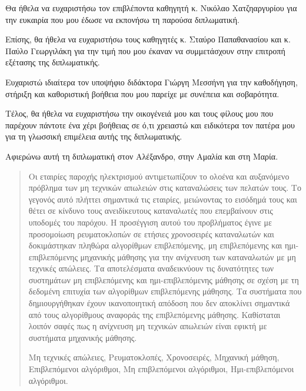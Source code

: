 \begin{acknowledgements}

Θα ήθελα να ευχαριστήσω τον επιβλέποντα καθηγητή κ. Νικόλαο Χατζηαργυρίου για την ευκαιρία που μου έδωσε να εκπονήσω τη παρούσα διπλωματική.

Επίσης, θα ήθελα να ευχαριστήσω  τους καθηγητές κ. Σταύρο Παπαθανασίου και κ. Παύλο Γεωργιλάκη για την τιμή που μου έκαναν να συμμετάσχουν στην επιτροπή εξέτασης της διπλωματικής.

Eυχαριστώ ιδιαίτερα τον υποψήφιο διδάκτορα Γιώργη Μεσσήνη για την καθοδήγηση, στήριξη και καθοριστική βοήθεια που μου παρείχε με συνέπεια και σοβαρότητα.

Τέλος, θα ήθελα να ευχαριστήσω την οικογένειά μου και τους φίλους μου που παρέχουν πάντοτε ένα χέρι βοήθειας σε ό,τι χρειαστώ και ειδικότερα τον πατέρα μου για τη γλωσσική επιμέλεια αυτής της διπλωματικής.

Αφιερώνω αυτή τη διπλωματική στον Αλέξανδρο, στην Αμαλία και στη Μαρία.
\end{acknowledgements}


\begin{abstract}
Οι εταιρίες παροχής ηλεκτρισμού αντιμετωπίζουν το ολοένα και αυξανόμενο πρόβλημα των μη τεχνικών απωλειών στις καταναλώσεις των πελατών τους. Το γεγονός αυτό πλήττει σημαντικά τις εταιρίες, μειώνοντας το εισόδημά τους και θέτει σε κίνδυνο τους ανειδίκευτους καταναλωτές που επεμβαίνουν στις υποδομές του παρόχου. Η προσέγγιση αυτού του προβλήματος έγινε με προσομοίωση ρευματοκλοπών σε ετήσιες χρονοσειρές καταναλωτών και δοκιμάστηκαν πληθώρα αλγορίθμων επιβλεπόμενης, μη επιβλεπόμενης και ημι-επιβλεπόμενης μηχανικής μάθησης για την ανίχνευση των καταναλωτών με μη τεχνικές απώλειες. Τα αποτελέσματα αναδεικνύουν τις δυνατότητες των συστημάτων μη επιβλεπόμενης και ημι-επιβλεπόμενης μάθησης σε σχέση με τη δεδομένη επιτυχία των αλγορίθμων επιβλεπόμενης μάθησης. Τα συστήματα που δημιουργήθηκαν έχουν ικανοποιητική απόδοση που δεν αποκλίνει σημαντικά από τους αλγορίθμους αναφοράς της επιβλεπόμενης μάθησης. Καθίσταται λοιπόν σαφές πως η ανίχνευση μη τεχνικών απωλειών είναι εφικτή με συστήματα μηχανικής μάθησης.

\begin{keywords}
  Μη τεχνικές απώλειες, Ρευματοκλοπές, Χρονοσειρές, Μηχανική μάθηση, Επιβλεπόμενοι αλγόριθμοι, Μη επιβλεπόμενοι αλγόριθμοι, Ημι-επιβλεπόμενοι αλγόριθμοι.
 
\end{keywords}

\end{abstract}



